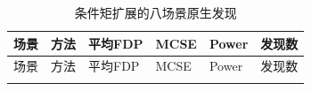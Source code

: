 \documentclass[UTF8,11pt,a4paper]{ctexart}
\begin{document}
{
\footnotesize
\begin{longtable}[]{@{}
  >{\raggedright\arraybackslash}p{}
  >{\raggedright\arraybackslash}p{}
  >{\raggedright\arraybackslash}p{}
  >{\raggedright\arraybackslash}p{}
  >{\raggedright\arraybackslash}p{}
  >{\raggedright\arraybackslash}p{}@{}}
\caption{条件矩扩展的八场景原生发现}\tabularnewline
\toprule\noalign{}
\begin{minipage}[b]{\linewidth}\raggedright
场景
\end{minipage} & \begin{minipage}[b]{\linewidth}\raggedright
方法
\end{minipage} & \begin{minipage}[b]{\linewidth}\raggedright
平均FDP
\end{minipage} & \begin{minipage}[b]{\linewidth}\raggedright
MCSE
\end{minipage} & \begin{minipage}[b]{\linewidth}\raggedright
Power
\end{minipage} & \begin{minipage}[b]{\linewidth}\raggedright
发现数
\end{minipage} \\
\midrule\noalign{}
\endfirsthead
\toprule\noalign{}
\begin{minipage}[b]{\linewidth}\raggedright
场景
\end{minipage} & \begin{minipage}[b]{\linewidth}\raggedright
方法
\end{minipage} & \begin{minipage}[b]{\linewidth}\raggedright
平均FDP
\end{minipage} & \begin{minipage}[b]{\linewidth}\raggedright
MCSE
\end{minipage} & \begin{minipage}[b]{\linewidth}\raggedright
Power
\end{minipage} & \begin{minipage}[b]{\linewidth}\raggedright
发现数
\end{minipage} \\
\midrule\noalign{}
\endhead
\bottomrule\noalign{}
\endlastfoot

\end{longtable}}
\end{document}
